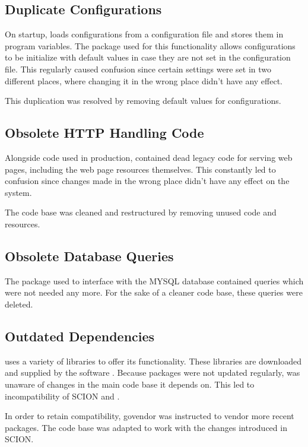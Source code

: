 \subsection{Duplicate Configurations}

On startup, \lcs loads configurations from a configuration file and stores them in program variables. The  package used for this functionality allows configurations to be initialize with default values in case they are not set in the configuration file. This regularly caused confusion since certain settings were set in two different places, where changing it in the wrong place didn't have any effect.

This duplication was resolved by removing default values for configurations.

\subsection{Obsolete HTTP Handling Code}

Alongside code used in production, \lcs contained dead legacy code for serving web pages, including the web page resources themselves. This constantly led to confusion since changes made in the wrong place didn't have any effect on the system.

The code base was cleaned and restructured by removing unused code and resources.

\subsection{Obsolete Database Queries}

The package used to interface with the MYSQL database contained queries which were not needed any more.
For the sake of a cleaner code base, these queries were deleted.

\subsection{Outdated Dependencies}

\lcs uses a variety of libraries to offer its functionality. These libraries are downloaded and supplied by the  software . Because packages were not updated regularly, \lcs was unaware of changes in the main  code base it depends on. This led to incompatibility of SCION and \lcs.

In order to retain compatibility, govendor was instructed to vendor more recent packages. The code base was adapted to work with the changes introduced in SCION.

